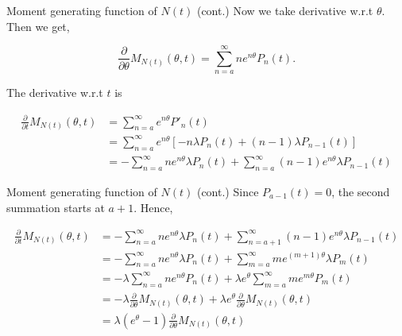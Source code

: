 \documentclass[12pt,ignorenonframetext,]{beamer}
\begin{document}
\begin{frame}{Moment generating function of \(N(t)\) (cont.)}
\protect\hypertarget{moment-generating-function-of-nt-cont.-1}{}
Now we take derivative w.r.t \(\theta\). Then we get,

\[\frac{\partial}{\partial \theta}M_{N(t)}(\theta, t) = \sum_{n=a}^\infty ne^{n \theta} P_n(t).\]

The derivative w.r.t \(t\) is

\begin{equation} \label{eq2}
\begin{split}
\frac{\partial}{\partial t}M_{N(t)}(\theta, t) &= \sum_{n=a}^\infty e^{n \theta} P'_n(t) \\
&= \sum_{n=a}^{\infty}e^{n \theta}[-n \lambda P_n(t) + (n-1) \lambda P_{n-1}(t)] \\
&= - \sum_{n=a}^{\infty} n e^{n \theta} \lambda P_n(t) + \sum_{n=a}^{\infty}(n-1)e^{n \theta}\lambda P_{n-1}(t)
\end{split}
\end{equation}
\end{frame}

\begin{frame}{Moment generating function of \(N(t)\) (cont.)}
\protect\hypertarget{moment-generating-function-of-nt-cont.-2}{}
Since \(P_{a-1}(t)=0\), the second summation starts at \(a+1\). Hence,

\begin{equation} \label{eq3}
\begin{split}
\frac{\partial}{\partial t}M_{N(t)}(\theta, t) &= - \sum_{n=a}^{\infty} n e^{n \theta} \lambda P_n(t) + \sum_{n=a+1}^{\infty}(n-1)e^{n \theta}\lambda P_{n-1}(t) \\
&= - \sum_{n=a}^{\infty} n e^{n \theta} \lambda P_n(t) + \sum_{m=a}^{\infty}me^{(m+1) \theta}\lambda P_{m}(t) \\
&= -\lambda \sum_{n=a}^{\infty}n e^{n\theta}P_n(t) + 
\lambda e^{\theta}\sum_{m=a}^{\infty}m e^{m \theta}P_m(t)\\
&= -\lambda \frac{\partial}{\partial \theta}M_{N(t)}(\theta, t) + \lambda e^{\theta} \frac{\partial}{\partial \theta}M_{N(t)}(\theta, t)\\
&= \lambda (e^{\theta} - 1)\frac{\partial}{\partial \theta}M_{N(t)}(\theta, t)
\end{split}
\end{equation}
\end{frame}
\end{document}

